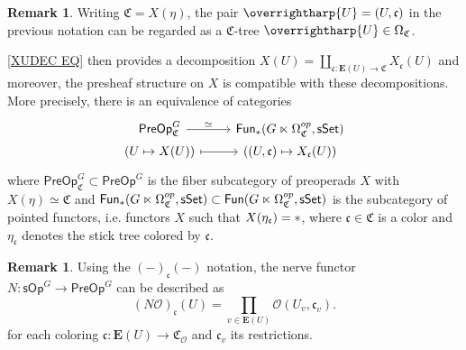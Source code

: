 \documentclass[a4paper,10pt
,draft
]{article}%
\numberwithin{equation}{section}
\numberwithin{figure}{section}
\theoremstyle{definition} %
\newtheorem{remark}[equation]{Remark}%
\newcommand{\vect}[1]{\text{\overrightharp{\ensuremath{#1}}}}
\renewcommand{\O}{\ensuremath{\mathcal O}}
\newcommand{\1}{\ensuremath{\mathbbm 1}}%
\begin{document}
\begin{remark}
	Writing $\mathfrak{C} = X(\eta)$,
	the pair $\vect{U} = (U,\mathfrak{c})$
	in the previous notation can be regarded as a 
	$\mathfrak{C}$-tree $\vect{U} \in \Omega_{\mathfrak{C}}$.
	
	\eqref{XUDEC EQ} then provides a decomposition
	$X(U) = \coprod_{\mathfrak{c} \colon \boldsymbol{E}(U) \to \mathfrak{C}} X_{\mathfrak{c}}(U)$ and moreover, the presheaf structure on $X$ is compatible with these decompositions.
	More precisely, there is an equivalence of categories
\[
\begin{tikzcd}[row sep = 0]
	\mathsf{PreOp}^G_{\mathfrak{C}}
	\ar{r}{\simeq}
&
	\mathsf{Fun}_{\**}(G \ltimes \Omega^{op}_{\mathfrak{C}},\mathsf{sSet})
\\
	(U \mapsto X(U))
	\ar[mapsto]{r}
&
	((U,\mathfrak{c}) \mapsto X_{\mathfrak{c}}(U))
\end{tikzcd}
\]
	where $\mathsf{PreOp}^G_{\mathfrak{C}} \subset \mathsf{PreOp}^G$
	is the fiber subcategory of 
	preoperads $X$ with $X(\eta) \simeq \mathfrak{C}$
	and
	$\mathsf{Fun}_{\**}(G \ltimes \Omega^{op}_{\mathfrak{C}},\mathsf{sSet})
	\subset
	\mathsf{Fun}(G \ltimes \Omega^{op}_{\mathfrak{C}},\mathsf{sSet})$
	is the subcategory of pointed functors,
	i.e. functors $X$ such that
	$X(\eta_{\mathfrak{c}}) = \**$,
	where $\mathfrak{c} \in \mathfrak{C}$ is a color
	and $\eta_{\mathfrak{c}}$ denotes the stick tree colored by $\mathfrak{c}$.
\end{remark}


\begin{remark}\label{ALTNER REM}
	Using the $(-)_{\mathfrak{c}}(-)$ notation,
	the nerve functor
	$N \colon \mathsf{sOp}^G \to \mathsf{PreOp}^G$
	can be described as
\[
	(N \O)_{\mathfrak{c}} (U) = 
	\prod_{v \in \boldsymbol{E}(U)}
	\O(U_v,\mathfrak{c}_v).
\]
for each coloring $\mathfrak{c} \colon \boldsymbol{E}(U) \to 
\mathfrak{C}_{\O}$
and $\mathfrak{c}_v$ its restrictions.
\end{remark}
\end{document}

